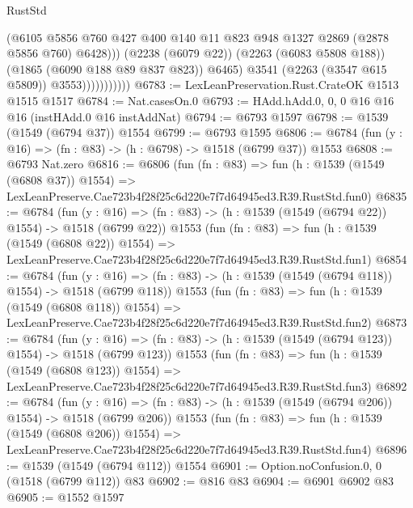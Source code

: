 \begin{lexlean}{RustStd}
\begin{coremodule}
                                (@6105
                                  @5856
                                  @760
                                  @427
                                  @400
                                  @140
                                  @11
                                  @823
                                  @948
                                  @1327
                                  @2869
                                  (@2878 @5856 @760)
                                  @6428)))
                            (@2238 (@6079 @22))
                            (@2263 (@6083 @5808 @188))
                            (@1865 (@6090 @188 @89 @837 @823))
                            @6465)
                          @3541
                          (@2263 (@3547 @615 @5809))
                          @3553)))))))))))
@6783 := LexLeanPreservation.Rust.CrateOK @1513 @1515 @1517
@6784 := Nat.casesOn.{0}
@6793 := HAdd.hAdd.{0, 0, 0} @16 @16 @16 (instHAdd.{0} @16 instAddNat)
@6794 := @6793 @1597
@6798 := @1539 (@1549 (@6794 @37)) @1554
@6799 := @6793 @1595
@6806 := @6784 (fun (y : @16) => (fn : @83) -> (h : @6798) -> @1518 (@6799 @37)) @1553
@6808 := @6793 Nat.zero
@6816 := @6806
    (fun (fn : @83) =>
    fun (h : @1539 (@1549 (@6808 @37)) @1554) =>
    LexLeanPreserve.Cae723b4f28f25c6d220e7f7d64945ed3.R39.RustStd.fun0)
@6835 := @6784
    (fun (y : @16) => (fn : @83) -> (h : @1539 (@1549 (@6794 @22)) @1554) -> @1518 (@6799 @22))
    @1553
    (fun (fn : @83) =>
    fun (h : @1539 (@1549 (@6808 @22)) @1554) =>
    LexLeanPreserve.Cae723b4f28f25c6d220e7f7d64945ed3.R39.RustStd.fun1)
@6854 := @6784
    (fun (y : @16) => (fn : @83) -> (h : @1539 (@1549 (@6794 @118)) @1554) -> @1518 (@6799 @118))
    @1553
    (fun (fn : @83) =>
    fun (h : @1539 (@1549 (@6808 @118)) @1554) =>
    LexLeanPreserve.Cae723b4f28f25c6d220e7f7d64945ed3.R39.RustStd.fun2)
@6873 := @6784
    (fun (y : @16) => (fn : @83) -> (h : @1539 (@1549 (@6794 @123)) @1554) -> @1518 (@6799 @123))
    @1553
    (fun (fn : @83) =>
    fun (h : @1539 (@1549 (@6808 @123)) @1554) =>
    LexLeanPreserve.Cae723b4f28f25c6d220e7f7d64945ed3.R39.RustStd.fun3)
@6892 := @6784
    (fun (y : @16) => (fn : @83) -> (h : @1539 (@1549 (@6794 @206)) @1554) -> @1518 (@6799 @206))
    @1553
    (fun (fn : @83) =>
    fun (h : @1539 (@1549 (@6808 @206)) @1554) =>
    LexLeanPreserve.Cae723b4f28f25c6d220e7f7d64945ed3.R39.RustStd.fun4)
@6896 := @1539 (@1549 (@6794 @112)) @1554
@6901 := Option.noConfusion.{0, 0} (@1518 (@6799 @112)) @83
@6902 := @816 @83
@6904 := @6901 @6902 @83
@6905 := @1552 @1597

\end{coremodule}
\end{lexlean}
